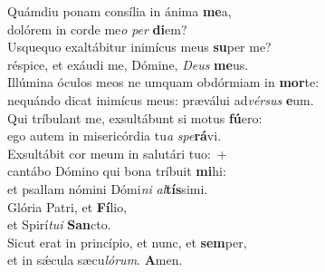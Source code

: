 \evenverse Quámdiu ponam consília in ánima \textbf{me}a,~\*\\
\evenverse dolórem in corde me\textit{o} \textit{per} \textbf{di}em?\\
\oddverse Usquequo exaltábitur inimícus meus \textbf{su}per me?~\*\\
\oddverse réspice, et exáudi me, Dómine, \textit{De}\textit{us} \textbf{me}us.\\
\evenverse Illúmina óculos meos ne umquam obdórmiam in \textbf{mor}te:~\*\\
\evenverse nequándo dicat inimícus meus: præválui ad\textit{vér}\textit{sus} \textbf{e}um.\\
\oddverse Qui tríbulant me, exsultábunt si motus \textbf{fú}ero:~\*\\
\oddverse ego autem in misericórdia tu\textit{a} \textit{spe}\textbf{rá}vi.\\
\evenverse Exsultábit cor meum in salutári tuo:~+\\
\evenverse  cantábo Dómino qui bona tríbuit \textbf{mi}hi:~\*\\
\evenverse et psallam nómini Dómi\textit{ni} \textit{al}\textbf{tís}simi.\\
\oddverse Glória Patri, et \textbf{Fí}lio,~\*\\
\oddverse et Spirí\textit{tu}\textit{i} \textbf{San}cto.\\
\evenverse Sicut erat in princípio, et nunc, et \textbf{sem}per,~\*\\
\evenverse et in sǽcula sæcu\textit{ló}\textit{rum}. \textbf{A}men.\\
